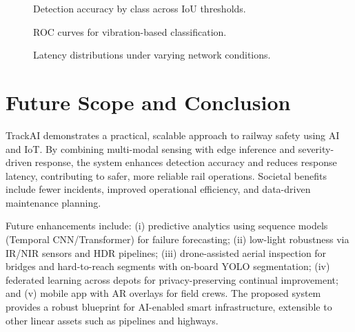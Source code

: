 \documentclass[conference]{IEEEtran}
\begin{document}
\begin{figure}[t]
\centering
{}
\caption{Detection accuracy by class across IoU thresholds.}
\label{fig:accuracy}
\end{figure}

\begin{figure}[t]
\centering
{}
\caption{ROC curves for vibration-based classification.}
\label{fig:roc}
\end{figure}

\begin{figure}[t]
\centering
{}
\caption{Latency distributions under varying network conditions.}
\label{fig:latency}
\end{figure}

\section{Future Scope and Conclusion}
\label{sec:conclusion}
TrackAI demonstrates a practical, scalable approach to railway safety using AI and IoT. By combining multi-modal sensing with edge inference and severity-driven response, the system enhances detection accuracy and reduces response latency, contributing to safer, more reliable rail operations. Societal benefits include fewer incidents, improved operational efficiency, and data-driven maintenance planning.

Future enhancements include: (i) predictive analytics using sequence models (Temporal CNN/Transformer) for failure forecasting; (ii) low-light robustness via IR/NIR sensors and HDR pipelines; (iii) drone-assisted aerial inspection for bridges and hard-to-reach segments with on-board YOLO segmentation; (iv) federated learning across depots for privacy-preserving continual improvement; and (v) mobile app with AR overlays for field crews. The proposed system provides a robust blueprint for AI-enabled smart infrastructure, extensible to other linear assets such as pipelines and highways.
\end{document}
